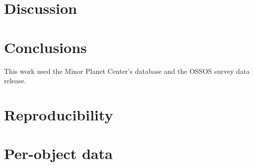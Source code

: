 \documentclass[twocolumn,linenumbers]{aastex631}
\begin{document}
\section{Discussion}\label{sec:discussion}

\section{Conclusions}\label{sec:conclusions}

\begin{acknowledgments}
This work used the Minor Planet Center's database and the OSSOS survey data release.
\end{acknowledgments}


\appendix
\section{Reproducibility}\label{app:repro}
\section{Per-object data}\label{app:objects}

{}

\end{document}

